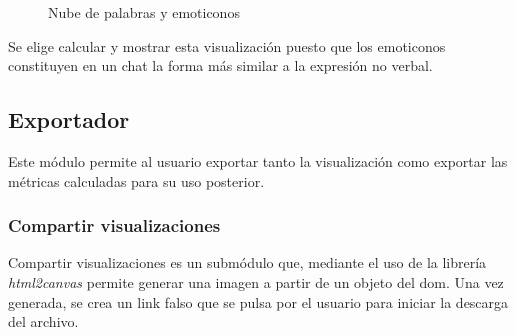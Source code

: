 \begin{figure}[H]
	\centering
	\qquad
	\caption{Nube de palabras y emoticonos}
	\label{fig:chap4:word_emoji_cloud}
\end{figure}

Se elige calcular y mostrar esta visualización puesto que los emoticonos constituyen en un chat la forma más similar a la expresión no verbal.

\subsection{Exportador}

Este módulo permite al usuario exportar tanto la visualización como exportar las métricas calculadas para su uso posterior.

\subsubsection{Compartir visualizaciones}

Compartir visualizaciones es un submódulo que, mediante el uso de la librería \textit{html2canvas} permite generar una imagen a partir de un objeto del \acrshort{dom}. Una vez generada, se crea un link falso que se pulsa por el usuario para iniciar la descarga del archivo.

